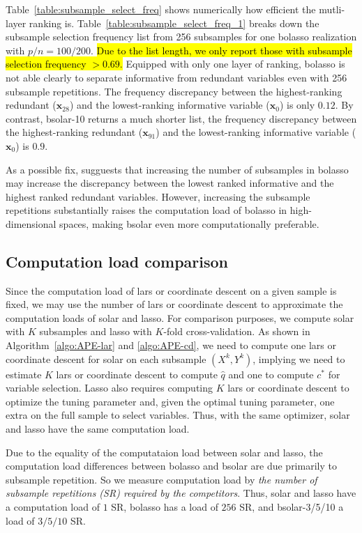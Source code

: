 \documentclass[12pt]{article}
\begin{document}
Table~\ref{table:subsample_select_freq} shows numerically how efficient the mutli-layer ranking is. Table~\ref{table:subsample_select_freq_1} breaks down the subsample selection frequency list from 256 subsamples for one bolasso realization with $p/n=100/200$. \hl{Due to the list length, we only report those with subsample selection frequency $>0.69$.}  Equipped with only one layer of ranking, bolasso is not able clearly to separate informative from redundant variables even with 256 subsample repetitions. The frequency discrepancy between the highest-ranking redundant ($\mathbf{x}_{28}$) and the lowest-ranking informative variable ($\mathbf{x}_0$) is only $0.12$. By contrast, bsolar-10 returns a much shorter list, the frequency discrepancy between the highest-ranking redundant ($\mathbf{x}_{91}$) and the lowest-ranking informative variable ($\mathbf{x}_0$) is $0.9$.

As a possible fix, \citet{bach2008bolasso} sugguests that increasing the number of subsamples in bolasso may increase the discrepancy between the lowest ranked informative and the highest ranked redundant variables. However, increasing the subsample repetitions substantially raises the computation load of bolasso in high-dimensional spaces, making bsolar even more computationally preferable.

\subsection{Computation load comparison \label{subsection:comp}}

Since the computation load of lars or coordinate descent on a given sample is fixed, we may use the number of lars or coordinate descent to approximate the computation loads of solar and lasso. For comparison purposes, we compute solar with $K$ subsamples and lasso with $K$-fold cross-validation. As shown in Algorithm~\ref{algo:APE-lar} and \ref{algo:APE-cd}, we need to compute one lars or coordinate descent for solar on each subsample $(X^k, Y^k)$, implying we need to estimate $K$ lars or coordinate descent to compute $\widehat{q}$ and one to compute $c^*$ for variable selection. Lasso also requires computing $K$ lars or coordinate descent to optimize the tuning parameter and, given the optimal tuning parameter, one extra on the full sample to select variables. Thus, with the same optimizer, solar and lasso have the same computation load.

Due to the equality of the computataion load between solar and lasso, the computation load differences between bolasso and bsolar are due primarily to subsample repetition. So we measure computation load by \emph{the number of subsample repetitions (SR) required by the competitors}. Thus, solar and lasso have a computation load of $1$ SR, bolasso has a load of $256$ SR, and bsolar-3/5/10 a load of $3/5/10$ SR.
\end{document}
